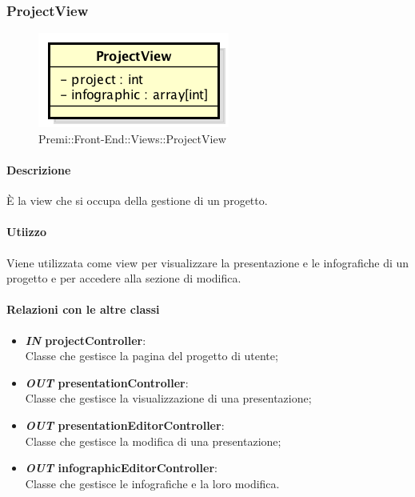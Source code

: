 	
\subsubsection{ProjectView}
	\begin{figure}[h]
		\centering
		\includegraphics[width=0.4\linewidth]{img/premi_front_end_views_projectview}
		\caption[Premi::Front-End::Views::ProjectView]{Premi::Front-End::Views::ProjectView}
	\end{figure}
	
	\paragraph{Descrizione}
	È la view che si occupa della gestione di un progetto.
	
	\paragraph{Utiizzo}
	Viene utilizzata come view per visualizzare la presentazione e le infografiche di un progetto e per accedere alla sezione di modifica.
	
	\paragraph{Relazioni con le altre classi}
	\begin{itemize}
		\item \textbf{\textit{IN} projectController}:\\
		Classe che gestisce la pagina del progetto di utente;
		\item \textbf{\textit{OUT} presentationController}:\\
		Classe che gestisce la visualizzazione di una presentazione;
		\item \textbf{\textit{OUT} presentationEditorController}:\\
		Classe che gestisce la modifica di una presentazione;
		\item \textbf{\textit{OUT} infographicEditorController}:\\
		Classe che gestisce le infografiche e la loro modifica.
	\end{itemize}
	
